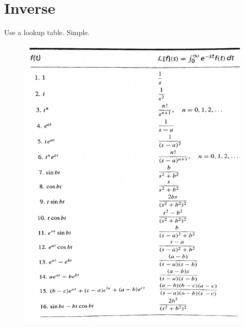 \documentclass[11pt]{article}
\begin{document}
\section{Inverse}
	Use a lookup table. Simple.
	\begin{figure}[htb]
		\centering
		\includegraphics[width=\textwidth]{laplace.png}
	\end{figure}

%		
%		


\end{document}
